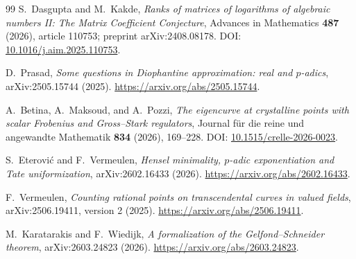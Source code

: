 \documentclass[11pt,oneside]{article}
\theoremstyle{definition}
\theoremstyle{remark}
\begin{document}
\begin{thebibliography}{99}
S.~Dasgupta and M.~Kakde,
\newblock \emph{Ranks of matrices of logarithms of algebraic numbers II: The Matrix
Coefficient Conjecture},
\newblock Advances in Mathematics \textbf{487} (2026), article 110753;
preprint arXiv:2408.08178.
\newblock DOI:
\href{https://doi.org/10.1016/j.aim.2025.110753}{10.1016/j.aim.2025.110753}.

D.~Prasad,
\newblock \emph{Some questions in Diophantine approximation: real and $p$-adics},
\newblock arXiv:2505.15744 (2025).
\newblock \url{https://arxiv.org/abs/2505.15744}.

A.~Betina, A.~Maksoud, and A.~Pozzi,
\newblock \emph{The eigencurve at crystalline points with scalar Frobenius and
Gross--Stark regulators},
\newblock Journal f\"ur die reine und angewandte Mathematik \textbf{834} (2026), 169--228.
\newblock DOI:
\href{https://doi.org/10.1515/crelle-2026-0023}{10.1515/crelle-2026-0023}.

S.~Eterovi\'c and F.~Vermeulen,
\newblock \emph{Hensel minimality, $p$-adic exponentiation and Tate uniformization},
\newblock arXiv:2602.16433 (2026).
\newblock \url{https://arxiv.org/abs/2602.16433}.

F.~Vermeulen,
\newblock \emph{Counting rational points on transcendental curves in valued fields},
\newblock arXiv:2506.19411, version 2 (2025).
\newblock \url{https://arxiv.org/abs/2506.19411}.

M.~Karatarakis and F.~Wiedijk,
\newblock \emph{A formalization of the Gelfond--Schneider theorem},
\newblock arXiv:2603.24823 (2026).
\newblock \url{https://arxiv.org/abs/2603.24823}.

\end{thebibliography}
\end{document}

